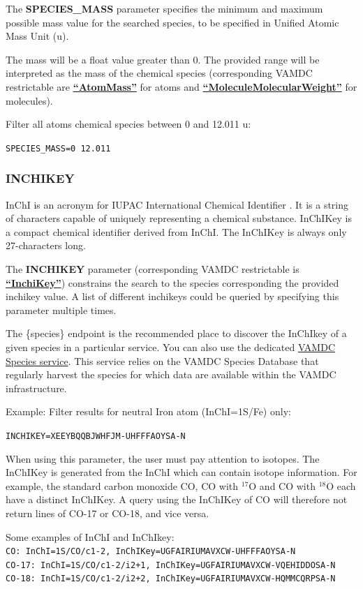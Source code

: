 \documentclass[11pt,a4paper]{ivoa}
\def\vamdcres#1{\href{https://dictionary.vamdc.eu/restrictables/\##1}{\textbf{``\color{vamdccolor}#1''}}}
\newcommand{\parexample}[1]{\noindent\quad\texttt{#1}}
\begin{document}
The \textbf{SPECIES\_MASS} parameter specifies the minimum and maximum possible mass value
for the searched species, to be specified in Unified Atomic Mass Unit (u).

The mass will be a float value greater than 0. The provided range will be interpreted as the
mass of the chemical species  (corresponding VAMDC restrictable are \vamdcres{AtomMass} for atoms and
\vamdcres{MoleculeMolecularWeight} for molecules).

Filter all atoms chemical species between 0 and 12.011 u:

\parexample{SPECIES\_MASS=0 12.011}

\subsubsection{INCHIKEY}

InChI is an acronym for IUPAC International Chemical Identifier \citep{Heller2015}.
It is a string of characters capable of uniquely representing a chemical substance.
InChIKey is a compact chemical identifier derived from InChI. The InChIKey is always
only 27-characters long.

The \textbf{INCHIKEY} parameter (corresponding VAMDC restrictable is \vamdcres{InchiKey})
constrains the search to the species corresponding the provided inchikey value. A list of different
inchikeys could be queried by specifying this parameter multiple times.

The \{species\}
endpoint is the recommended place to discover the InChIkey of a given species in a particular service. You can also
use the dedicated \href{https://species.vamdc.org/}{VAMDC Species service}. This service relies on the VAMDC Species
Database \citep{Zwölf2024} that regularly harvest the species for which data are available within the VAMDC infrastructure.

Example: Filter results for neutral Iron atom (InChI=1S/Fe) only:

\parexample{INCHIKEY=XEEYBQQBJWHFJM-UHFFFAOYSA-N}

When using this parameter, the user must pay attention to isotopes.
The InChIKey is generated from the InChI which can contain isotope information.
For example, the standard carbon monoxide CO, CO with $^{17}$O and CO with $^{18}$O
each have a distinct InChIKey. A query using the InChIKey of CO will therefore
not return lines of CO-17 or CO-18, and vice versa.

Some examples of InChI and InChIkey: \\
\parexample{CO:    InChI=1S/CO/c1-2, InChIKey=UGFAIRIUMAVXCW-UHFFFAOYSA-N} \\
\parexample{CO-17: InChI=1S/CO/c1-2/i2+1, InChIKey=UGFAIRIUMAVXCW-VQEHIDDOSA-N} \\
\parexample{CO-18: InChI=1S/CO/c1-2/i2+2, InChIKey=UGFAIRIUMAVXCW-HQMMCQRPSA-N}
\end{document}
